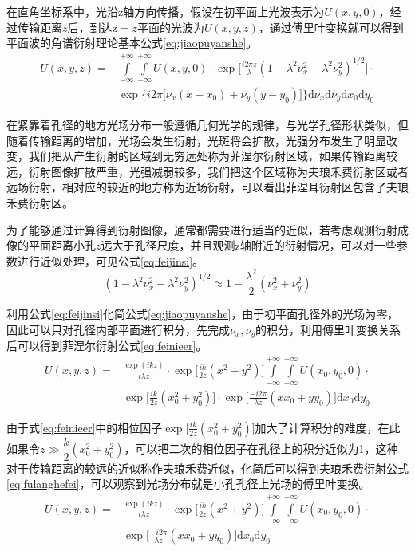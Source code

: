 在直角坐标系中，光沿z轴方向传播，假设在初平面上光波表示为$U(x,y,0)$，经过传输距离$z$后，到达z$=z$平面的光波为$U(x,y,z)$，通过傅里叶变换就可以得到平面波的角谱衍射理论基本公式\eqref{eq:jiaopuyanshe}。
\begin{equation}
\begin{aligned}
U(x,y,z)=&\int\limits_{-\infty}^{+\infty}\!\int\limits_{-\infty}^{+\infty}U(x,y,0)\cdot\exp\big[\frac{i2\pi z}{\lambda}(1-\lambda^2\nu_x^2-\lambda^2\nu_y^2)^{1/2}\big]\cdot\\
&\exp\Big\{i2\pi\big[\nu_x(x-x_0)+\nu_y(y-y_0)\big]\Big\}\text{d}\nu_x\text{d}\nu_y\text{d}x_0\text{d}y_0
\end{aligned}
\label{eq:jiaopuyanshe}
\end{equation}

在紧靠着孔径的地方光场分布一般遵循几何光学的规律，与光学孔径形状类似，但随着传输距离的增加，光场会发生衍射，光斑将会扩散，光强分布发生了明显改变，我们把从产生衍射的区域到无穷远处称为菲涅尔衍射区域，如果传输距离较远，衍射图像扩散严重，光强减弱较多，我们把这个区域称为夫琅禾费衍射区或者远场衍射，相对应的较近的地方称为近场衍射，可以看出菲涅耳衍射区包含了夫琅禾费衍射区。

为了能够通过计算得到衍射图像，通常都需要进行适当的近似，若考虑观测衍射成像的平面距离小孔$z$远大于孔径尺度，并且观测z轴附近的衍射情况，可以对一些参数进行近似处理，可见公式\eqref{eq:feijinsi}。
\begin{equation}
(1-\lambda^2\nu_x^2-\lambda^2\nu_y^2)^{1/2}\approx1-\frac{\lambda^2}{2}(\nu_x^2+\nu_y^2)
\label{eq:feijinsi}
\end{equation}

利用公式\eqref{eq:feijinsi}化简公式\eqref{eq:jiaopuyanshe}，由于初平面孔径外的光场为零，因此可以只对孔径内部平面进行积分，先完成$\nu_x,\nu_y$的积分，利用傅里叶变换关系后可以得到菲涅尔衍射公式\eqref{eq:feinieer}。
\begin{equation}
\begin{aligned}
U(x,y,z)=&\frac{\exp(ikz)}{i\lambda z}\cdot\exp\big[\frac{ik}{2z}(x^2+y^2)\big]\int\limits_{-\infty}^{+\infty}\int\limits_{-\infty}^{+\infty}U(x_0,y_0,0)\cdot\\
&\exp\big[\frac{ik}{2z}(x_0^2+y_0^2)\big]\cdot\exp\Big[\frac{-i2\pi}{\lambda z}(xx_0+yy_0)\Big]\text{d}x_0\text{d}y_0
\end{aligned}
\label{eq:feinieer}
\end{equation}

由于式\eqref{eq:feinieer}中的相位因子$\exp\big[\frac{ik}{2z}(x_0^2+y_0^2)\big]$加大了计算积分的难度，在此如果令$z\gg\dfrac{k}{2}(x_0^2+y_0^2)$，可以把二次的相位因子在孔径上的积分近似为1，这种对于传输距离的较远的近似称作夫琅禾费近似，化简后可以得到夫琅禾费衍射公式\eqref{eq:fulanghefei}，可以观察到光场分布就是小孔孔径上光场的傅里叶变换。
\begin{equation}
\begin{aligned}
U(x,y,z)=&\frac{\exp(ikz)}{i\lambda z}\cdot\exp\big[\frac{ik}{2z}(x^2+y^2)\big]\int\limits_{-\infty}^{+\infty}\int\limits_{-\infty}^{+\infty}U(x_0,y_0,0)\cdot\\
&\exp\Big[\frac{-i2\pi}{\lambda z}(xx_0+yy_0)\Big]\text{d}x_0\text{d}y_0
\end{aligned}
\label{eq:fulanghefei}
\end{equation}

